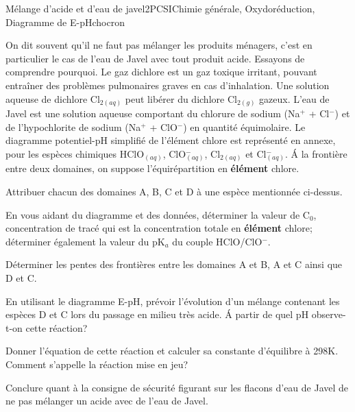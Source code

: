 \begin{exercise}{Mélange d'acide et d'eau de javel}{2}{PCSI}{Chimie générale, Oxydoréduction, Diagramme de E-pH}{chocron}

On dit souvent qu'il ne faut pas mélanger les produits ménagers, c'est en particulier le cas de l'eau de Javel  avec tout produit acide. Essayons de comprendre pourquoi. Le gaz dichlore est un gaz toxique irritant, pouvant entraîner des problèmes pulmonaires graves en cas d'inhalation. Une solution aqueuse de dichlore Cl$_{2(aq)}$ peut libérer du dichlore Cl$_{2(g)}$ gazeux. L'eau de Javel est une solution aqueuse comportant du chlorure de sodium (Na$^+$ + Cl$^-$) et de l'hypochlorite de sodium (Na$^+$ + ClO$^-$) en quantité équimolaire. Le diagramme potentiel-pH simplifié de l'élément chlore est représenté en annexe, pour les espèces chimiques HClO$_{(aq)}$, ClO$^-_{(aq)}$, Cl$_{2(aq)}$ et Cl$^-_{(aq)}$. \'A la frontière entre deux domaines, on suppose l'équirépartition en \textbf{élément} chlore. 

\begin{questions}
\question Attribuer chacun des domaines A, B, C et D à une espèce mentionnée ci-dessus.

\question En vous aidant du diagramme et des données, déterminer la valeur de C$_0$, concentration de tracé qui est la concentration totale en \textbf{élément} chlore; déterminer également la valeur du pK$_a$ du couple HClO/ClO$^-$.

\question Déterminer les pentes des frontières entre les domaines A et B, A et C ainsi que D et C. 

\question En utilisant le diagramme E-pH, prévoir l'évolution d'un mélange contenant les espèces D et C lors du passage en milieu très acide. \'A partir de quel pH observe-t-on cette réaction?

\question Donner l'équation de cette réaction et calculer sa constante d'équilibre à 298K. Comment s'appelle la réaction mise en jeu? 

\question  Conclure quant à la consigne de sécurité figurant sur les flacons d'eau de Javel de ne pas mélanger un acide avec de l'eau de Javel. 


\end{questions}
\end{exercise}
